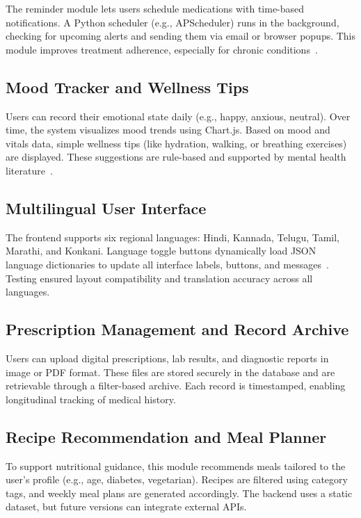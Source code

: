 \documentclass[conference]{IEEEtran}
\begin{document}
The reminder module lets users schedule medications with time-based notifications. A Python scheduler (e.g., APScheduler) runs in the background, checking for upcoming alerts and sending them via email or browser popups. This module improves treatment adherence, especially for chronic conditions~\cite{karim2023aihealth}.

\subsection{Mood Tracker and Wellness Tips}

Users can record their emotional state daily (e.g., happy, anxious, neutral). Over time, the system visualizes mood trends using Chart.js. Based on mood and vitals data, simple wellness tips (like hydration, walking, or breathing exercises) are displayed. These suggestions are rule-based and supported by mental health literature~\cite{shatte2019machine}.

\subsection{Multilingual User Interface}

The frontend supports six regional languages: Hindi, Kannada, Telugu, Tamil, Marathi, and Konkani. Language toggle buttons dynamically load JSON language dictionaries to update all interface labels, buttons, and messages~\cite{srivastava2020multilingual}. Testing ensured layout compatibility and translation accuracy across all languages.

\subsection{Prescription Management and Record Archive}

Users can upload digital prescriptions, lab results, and diagnostic reports in image or PDF format. These files are stored securely in the database and are retrievable through a filter-based archive. Each record is timestamped, enabling longitudinal tracking of medical history.

\subsection{Recipe Recommendation and Meal Planner}

To support nutritional guidance, this module recommends meals tailored to the user’s profile (e.g., age, diabetes, vegetarian). Recipes are filtered using category tags, and weekly meal plans are generated accordingly. The backend uses a static dataset, but future versions can integrate external APIs.
\end{document}
